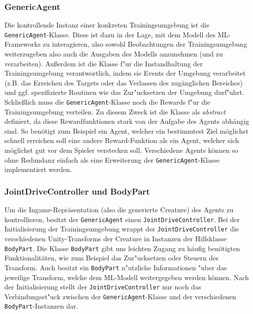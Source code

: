 \subsubsection{GenericAgent}

Die kontrollende Instanz einer konkreten Trainingsumgebung ist die \texttt{GenericAgent}-Klasse. Diese ist dazu in der Lage, mit dem Modell des ML-Frameworks zu interagieren, also sowohl Beobachtungen der Trainingsumgebung weiterzugeben also auch die Ausgaben des Modells anzunehmen (und zu verarbeiten). Außerdem ist die Klasse f"ur die Instandhaltung der Trainingsumgebung verantwortlich, indem sie Events der Umgebung verarbeitet (z.B. das Erreichen des Targets oder das Verlassen des zugänglichen Bereiches) und ggf. spezifizierte Routinen wie das Zur"ucksetzen der Umgebung durf"uhrt.
Schließlich muss die \texttt{GenericAgent}-Klasse noch die Rewards f"ur die Trainingsumgebung verteilen. Zu diesem Zweck ist die Klasse als \textit{abstract} definiert, da diese Rewardfunktionen stark von der Aufgabe des Agents abhängig sind. So benötigt zum Beispiel ein Agent, welcher ein bestimmtest Ziel möglichst schnell erreichen soll eine andere Reward-Funktion als ein Agent, welcher sich möglichst gut vor dem Spieler verstecken soll. Verschiedene Agents können so ohne Redundanz einfach als eine Erweiterung der \texttt{GenericAgent}-Klasse implementiert werden.


\subsubsection{JointDriveController und BodyPart}

Um die Ingame-Repräsentation (also die generierte Creature) des Agents zu kontrollieren, besitzt der \texttt{GenericAgent} einen \texttt{JointDriveController}. Bei der Initialisierung der Trainingsumgebung wrappt der \texttt{JointDriveController} die verschiedenen Unity-Transforms der Creature in Instanzen der Hilfsklasse \texttt{BodyPart}. Die Klasse \texttt{BodyPart} gibt uns leichten Zugang zu häufig benötigten Funktionalitäten, wie zum Beispiel das Zur"ucksetzen oder Steuern des Transform. Auch besitzt ein \texttt{BodyPart} n"utzliche Informationen "uber das jeweilige Transform, welche dem ML-Modell weitergegeben werden können. Nach der Initialisierung stellt der \texttt{JointDriveController} nur noch das Verbindungsst"uck zwischen der \texttt{GenericAgent}-Klasse und der verschiedenen \texttt{BodyPart}-Instanzen dar.


